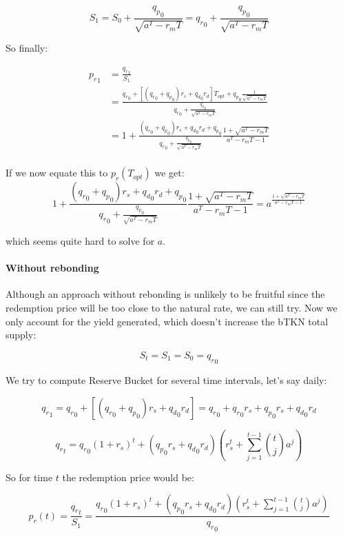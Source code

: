 \documentclass{article}
\begin{document}
\[
S_1 = S_0 + \frac{{q_p}_0}{\sqrt{a^T - r_mT}} = {q_r}_0 + \frac{{q_p}_0}{\sqrt{a^T - r_mT}}
\]

So finally:

\begin{equation}
  \label{eq:conservative_p_r_1}
  \begin{split}
    {p_r}_1 & = \frac{{q_r}_1}{S_1} \\
    & = \frac{{q_r}_0 + [({q_r}_0 + {q_p}_0)r_s + {q_d}_0 r_d] T_{opt} + {q_p}_0 \frac{1}{\sqrt{a^T - r_mT}}}{{q_r}_0 + \frac{{q_p}_0}{\sqrt{a^T - r_mT}}} \\
    & = 1 + \frac{({q_r}_0 + {q_p}_0)r_s + {q_d}_0 r_d + {q_p}_0}{{q_r}_0 + \frac{{q_p}_0}{\sqrt{a^T - r_mT}}} \frac{1+ \sqrt{a^T - r_mT}}{a^T - r_mT - 1} \\
  \end{split}
\end{equation}

If we now equate this to $p_r(T_{opt})$ we get:
\begin{equation}
  \label{}
1 + \frac{({q_r}_0 + {q_p}_0)r_s + {q_d}_0 r_d + {q_p}_0}{{q_r}_0 + \frac{{q_p}_0}{\sqrt{a^T - r_mT}}} \frac{1+ \sqrt{a^T - r_mT}}{a^T - r_mT - 1} = a ^{\frac{1+ \sqrt{a^T - r_mT}}{a^T - r_mT - 1}}
\end{equation}

which seems quite hard to solve for $a$.

\paragraph{Without rebonding}

Although an approach without rebonding is unlikely to be fruitful since the redemption price will be too close to the natural rate, we can still try. Now we only account for the yield generated, which doesn’t increase the bTKN total supply:

\[
S_t = S_1 = S_0 = {q_r}_0
\]

We try to compute Reserve Bucket for several time intervals, let’s say daily:

\[
{q_r}_1 = {q_r}_0 + [({q_r}_0 + {q_p}_0) r_s + {q_d}_0 r_d] = {q_r}_0 + {q_r}_0 r_s + {q_p}_0 r_s + {q_d}_0 r_d
\]

\[
{q_r}_t = {q_r}_0(1+r_s)^t + ({q_p}_0 r_s + {q_d}_0 r_d) \left(r_s^t + \sum_{j=1}^{t-1} \binom{t}{j} a^j \right)
\]

So for time $t$ the redemption price would be:

\[
p_r(t) = \frac{{q_r}_t}{S_1} = \frac{{q_r}_0(1+r_s)^t + ({q_p}_0 r_s + {q_d}_0 r_d) \left(r_s^t + \sum_{j=1}^{t-1} \binom{t}{j} a^j \right)}{{q_r}_0}
\]
\end{document}
